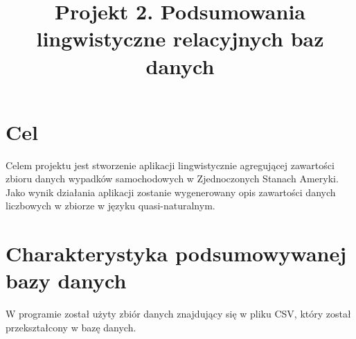 \documentclass{classrep}
\author{
  \studentinfo{Julia Szymańska}{224441} \and
  \studentinfo{Przemysław Zdrzalik}{224466} }
\title{Projekt 2.  Podsumowania lingwistyczne relacyjnych baz danych}
\begin{document}
\maketitle

\section{Cel}
Celem projektu jest stworzenie aplikacji lingwistycznie agregującej zawartości zbioru danych wypadków samochodowych w Zjednoczonych Stanach Ameryki\cite{dane}. Jako wynik działania aplikacji zostanie wygenerowany opis zawartości danych liczbowych w zbiorze w języku quasi-naturalnym.

\section{Charakterystyka podsumowywanej bazy danych}
W programie został użyty zbiór danych\cite{dane} znajdujący się w pliku CSV, który został przekształcony w bazę danych. 
\end{document}
